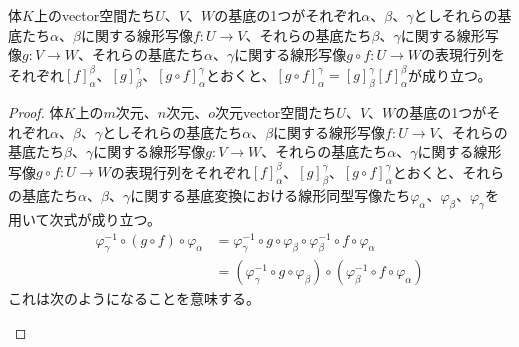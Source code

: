 \documentclass[dvipdfmx]{jsarticle}
\begin{document}
\begin{thm}
\label{2.1.5.7}
体$K$上のvector空間たち$U$、$V$、$W$の基底の1つがそれぞれ$\alpha$、$\beta$、$\gamma$としそれらの基底たち$\alpha$、$\beta$に関する線形写像$f:U \rightarrow V$、それらの基底たち$\beta$、$\gamma$に関する線形写像$g:V \rightarrow W$、それらの基底たち$\alpha$、$\gamma$に関する線形写像$g \circ f:U \rightarrow W$の表現行列をそれぞれ$[ f]^{\beta}_{\alpha}$、$[ g]^{\gamma}_{\beta}$、$[ g \circ f]^{\gamma}_{\alpha}$とおくと、$[ g \circ f]^{\gamma}_{\alpha} = [ g]^{\gamma}_{\beta}[ f]^{\beta}_{\alpha}$が成り立つ。
\end{thm}
\begin{proof}
体$K$上の$m$次元、$n$次元、$o$次元vector空間たち$U$、$V$、$W$の基底の1つがそれぞれ$\alpha$、$\beta$、$\gamma$としそれらの基底たち$\alpha$、$\beta$に関する線形写像$f:U \rightarrow V$、それらの基底たち$\beta$、$\gamma$に関する線形写像$g:V \rightarrow W$、それらの基底たち$\alpha$、$\gamma$に関する線形写像$g \circ f:U \rightarrow W$の表現行列をそれぞれ$[ f]^{\beta}_{\alpha}$、$[ g]^{\gamma}_{\beta}$、$[ g \circ f]^{\gamma}_{\alpha}$とおくと、それらの基底たち$\alpha$、$\beta$、$\gamma$に関する基底変換における線形同型写像たち$\varphi_{\alpha}$、$\varphi_{\beta}$、$\varphi_{\gamma}$を用いて次式が成り立つ。
\begin{align*}
\varphi_{\gamma}^{- 1} \circ (g \circ f) \circ \varphi_{\alpha} &= \varphi_{\gamma}^{- 1} \circ g \circ \varphi_{\beta} \circ \varphi_{\beta}^{- 1} \circ f \circ \varphi_{\alpha}\\
&= \left( \varphi_{\gamma}^{- 1} \circ g \circ \varphi_{\beta} \right) \circ \left( \varphi_{\beta}^{- 1} \circ f \circ \varphi_{\alpha} \right)
\end{align*}
これは次のようになることを意味する。
\begin{center}
\end{center}
\end{proof}
\end{document}
